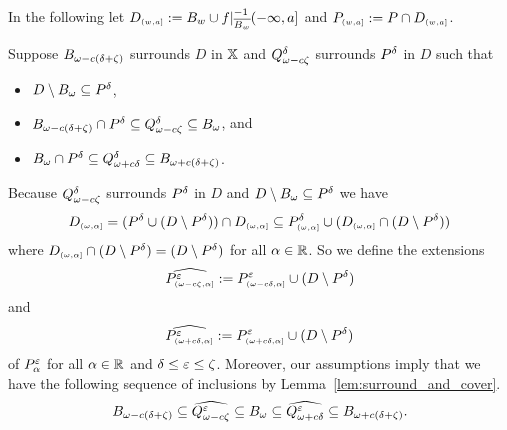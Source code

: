 
\clearpage

In the following let $D\subi{w,a} := B_w\cup f\rest_{\comp{B_w}}^{-1}(-\infty,a]$ and $P\subi{w,a} := P\cap D\subi{w,a}$.

Suppose $\b$ surrounds $D$ in $\X$ and $\Q^\of$ surrounds $\P$ in $D$ such that
\begin{itemize}
  \item $D\setminus \B\subseteq \P$,
  \item $\b\cap \P \subseteq \Q^\of\subseteq \B$, and
  \item $\B\cap \P\subseteq \QQ^\of\subseteq \BB$.
\end{itemize}

Because $\Q^\delta$ surrounds $\P$ in $D$ and $D\setminus \B\subseteq \P$ we have
\[ D\subi{\omega,\alpha} = (\P\cup (D\setminus \P))\cap D\subi{\omega,\alpha}\subseteq \P\subi{\omega,\alpha} \cup (D\subi{\omega,\alpha}\cap (D\setminus \P))\]
where $D\subi{\omega,\alpha}\cap (D\setminus \P) = (D\setminus \P)$ for all $\alpha\in\R$.
So we define the extensions
\[\ext{P^\e\subi{\omega-c\zeta, \alpha}} := P^\e\subi{\omega-c\delta, \alpha}\cup (D\setminus \P)\]
and
\[\ext{P^\e\subi{\omega+c\delta, \alpha}} := P^\e\subi{\omega+c\delta, \alpha}\cup (D\setminus \P)\]
of $P^\e_\alpha$ for all $\alpha\in\R$ and $\delta\leq\e\leq\zeta$.
Moreover, our assumptions imply that we have the following sequence of inclusions by Lemma~\ref{lem:surround_and_cover}.
\[ \b\subseteq \ext{\Q^\e}\subseteq \B\subseteq\ext{\QQ^\e}\subseteq \BB.\]

